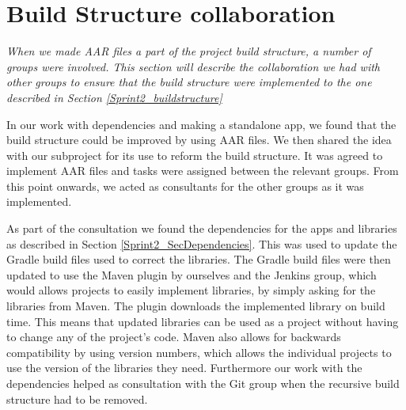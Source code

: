 \section{Build Structure collaboration}\label{Collab_secBuildStructure}
\textit{When we made AAR files a part of the project build structure, a number of groups were involved. This section will describe the collaboration we had with other groups to ensure that the build structure were implemented to the one described in Section \ref{Sprint2_buildstructure}}

In our work with dependencies and making a standalone app, we found that the build structure could be improved by using AAR files. We then shared the idea with our subproject for its use to reform the build structure. It was agreed to implement AAR files and tasks were assigned between the relevant groups. From this point onwards, we acted as consultants for the other groups as it was implemented.

As part of the consultation we found the dependencies for the apps and libraries as described in Section \ref{Sprint2_SecDependencies}. This was used to update the Gradle build files used to correct the libraries. The Gradle build files were then updated to use the Maven plugin by ourselves and the Jenkins group, which would allows projects to easily implement libraries, by simply asking for the libraries from Maven. The plugin downloads the implemented library on build time. This means that updated libraries can be used as a project without having to change any of the project's code. Maven also allows for backwards compatibility by using version numbers, which allows the individual projects to use the version of the libraries they need. Furthermore our work with the dependencies helped as consultation with the Git group when the recursive build structure had to be removed.
